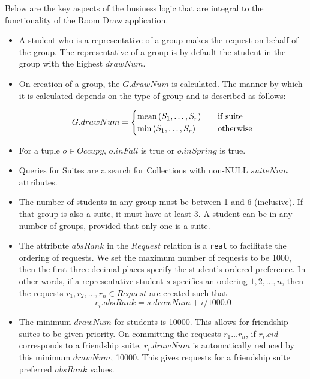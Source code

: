 \noindent Below are the key aspects of the business logic that are integral to
the functionality of the Room Draw application.

\begin{itemize}
\item A student who is a representative of a group makes the request on behalf
of the group. The representative of a group is by default the student in the
group with the highest \(drawNum\).

\item On creation of a group, the \(G.drawNum\) is calculated. The manner by
which it is calculated depends on the type of group and is described as follows:

\[
    G.drawNum =
        \begin{cases}
        \text{mean} \del{S_1, \ldots, S_r} & \quad \mbox{if suite} \\
        \min \del{S_1, \ldots, S_r} & \quad \mbox{otherwise}
        \end{cases}
\]

\item For a tuple \(o \in Occupy\), \(o.inFall\) is true or \(o.inSpring\) is true.

\item Queries for Suites are a search for Collections with non-NULL \(suiteNum\)
attributes.

\item The number of students in any group must be between 1 and 6 (inclusive).
If that group is also a suite, it must have at least 3. A student can be in any
number of groups, provided that only one is a suite.

\item The attribute \(absRank\) in the \(Request\) relation is a \texttt{real} to
facilitate the ordering of requests.  We set the maximum number of requests to
be 1000, then the first three decimal places specify the student's ordered
preference. In other words, if a representative student \(s\) specifies an
ordering \(1,2,\ldots, n\), then the requests \(r_1,r_2, \ldots, r_n \in
Request\) are created such that \[r_i.absRank = s.drawNum + i/1000.0\]

\item The minimum \(drawNum\) for students is \num{10000}. This allows for
friendship suites to be given priority. On committing the requests \(r_1\ldots
r_n\), if \(r_i.cid\) corresponds to a friendship suite, \(r_i.drawNum\) is
automatically reduced by this minimum \(drawNum\), \num{10000}. This gives
requests for a friendship suite preferred \(absRank\) values.
\end{itemize}

